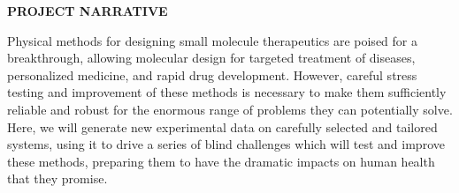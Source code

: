 \documentclass[11pt]{article}
\begin{document}


\begin{centering}
{\bf PROJECT NARRATIVE}

\end{centering}

Physical methods for designing small molecule therapeutics are poised for a breakthrough, allowing molecular design for targeted treatment of diseases, personalized medicine, and rapid drug development. 
However, careful stress testing and improvement of these methods is necessary to make them sufficiently reliable and robust for the enormous range of problems they can potentially solve. 
Here, we will generate new experimental data on carefully selected and tailored systems, using it to drive a series of blind challenges which will test and improve these methods, preparing them to have the dramatic impacts on human health that they promise. 



%
%
%
%
\end{document}
